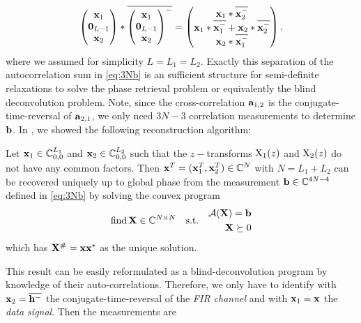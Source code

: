 \documentclass[conference]{IEEEtran}
\begin{document}
%
\begin{align}
  \begin{pmatrix} {\ensuremath{\mathbf x}}_1\\ {\mathbf 0}_{L-1} \\ {\mathbf x}_2\end{pmatrix}
  * {\overline{\begin{pmatrix} {{\ensuremath{\mathbf x}}_1}\\ {\mathbf 0}_{L-1} \\ {{\mathbf x}_2}\end{pmatrix}^-}}
  = \begin{pmatrix} {\ensuremath{\mathbf x}}_1*{\overline{{\mathbf x}_2^-}}\\ {\mathbf x}_1*{\overline{{\mathbf x}_1^-}}+{\mathbf x}_2*{\overline{{\mathbf x}_2^-}}\\ {\mathbf x}_2*{\overline{{\mathbf x}_1^-}}\end{pmatrix},
\end{align}
%
where we assumed for simplicity $L=L_1=L_2$.  Exactly this separation of the autocorrelation sum in \eqref{eq:3Nb} is an
sufficient structure for semi-definite relaxations to solve the phase retrieval problem or equivalently the blind
deconvolution problem. 
%
Note, since the cross-correlation ${\mathbf a}_{1,2}$ is the conjugate-time-reversal of ${\mathbf a}_{2,1}$, we only need $3N-3$
correlation measurements to determine ${\mathbf b}$.
%
In \cite{WJPH17},\cite{WJPH16a} we showed the following reconstruction algorithm: 
%
\begin{theorem}\label{thm:4correlation}
  Let ${\mathbf x}_1\in{\ensuremath{\mathbb C}}_{0,0}^{L_1}$ and ${\mathbf x}_2\in{\ensuremath{\mathbb C}}_{0,0}^{L_2}$ such that the $z-$transforms  ${\mathrm X}_1(z)$ and ${\mathrm X}_2(z)$ do not have any
  common factors. Then ${\mathbf x}^T=({\mathbf x}_1^T,{\mathbf x}_2^T)\in{\ensuremath{\mathbb C}}^N$ with $N=L_1+L_2$ can be recovered
  uniquely up to global phase from the measurement ${\mathbf b}\in{\ensuremath{\mathbb C}}^{4N-4}$ defined  in \eqref{eq:3Nb} by
  solving the convex program
  \begin{align}
    \operatorname{find} {\mathbf X}\in{\ensuremath{\mathbb C}}^{N\times N}\quad\text{s.t.}\quad \begin{split}{\ensuremath{\mathcal{A}}}({\mathbf X})={\mathbf b}\\ {\mathbf X}\succeq 0\end{split} \label{eq:fcp3N}
  \end{align}
  which has ${\mathbf X}^{\#}={\mathbf x}{\mathbf x}^*$ as the unique solution. 
\end{theorem}
%
This result can be easily reformulated as a blind-deconvolution program by knowledge of their auto-correlations.
Therefore, we only have to identify with ${\mathbf x}_2 ={\overline{{\mathbf h}^-}}$ the conjugate-time-reversal of the \emph{FIR channel} and
with ${\mathbf x}_1={\mathbf x}$ the \emph{data signal}. Then the measurements are 
%
\end{document}
